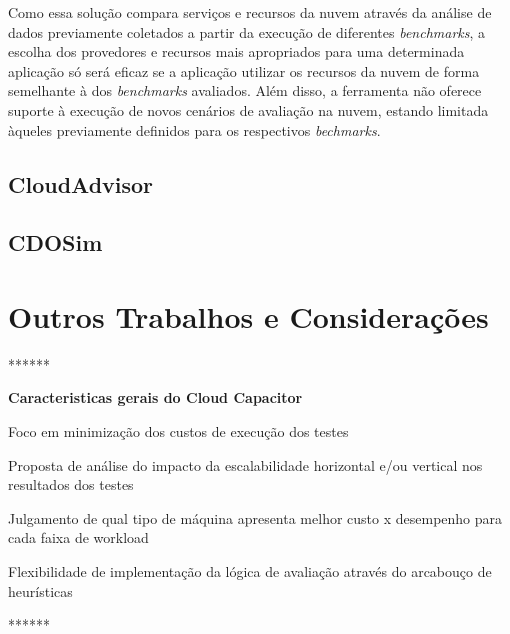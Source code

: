 Como essa solução compara serviços e recursos da nuvem através da análise de dados
previamente coletados a partir da execução de diferentes {\em benchmarks}, a
escolha dos provedores e recursos mais apropriados para uma determinada aplicação só será eficaz se a aplicação utilizar os recursos da nuvem de forma semelhante à dos {\em benchmarks} avaliados. Além disso, a
ferramenta não oferece suporte à execução de novos cenários de avaliação na nuvem, estando limitada àqueles previamente definidos para os respectivos {\em bechmarks}.

\subsection{CloudAdvisor}
\cite{jung2013cloudadvisor}

\subsection{CDOSim}
\cite{fittkau2012cdosim}



\section{Outros Trabalhos e Considerações}

******

\textbf{Caracteristicas gerais do Cloud Capacitor}

Foco em minimização dos custos de execução dos testes

Proposta de análise do impacto da escalabilidade horizontal e/ou vertical nos 
resultados dos testes

Julgamento de qual tipo de máquina apresenta melhor custo x desempenho para cada
faixa de workload

Flexibilidade de implementação da lógica de avaliação através do arcabouço de
heurísticas

******

